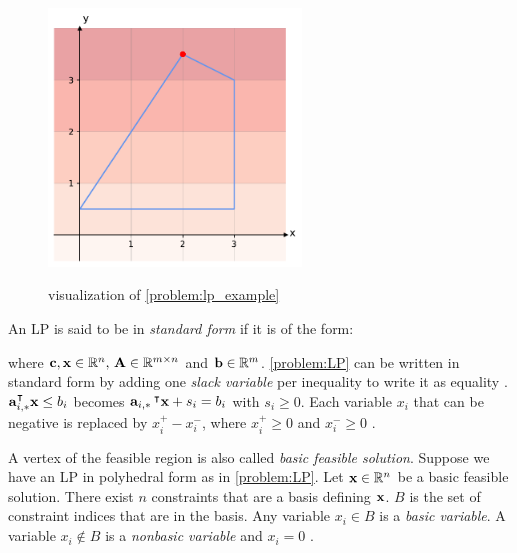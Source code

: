 \begin{figure}[h!]
    \caption{visualization of \cref{problem:lp_example}}
    \centering
    \includegraphics[width=0.6\textwidth]{Images/lp.pdf}
    \label{fig:lp}
\end{figure} 

An LP is said to be in \textit{standard form} if it is of the form:

\quad where $\bold c, \bold x \in \mathbb{R}^n, \, \bold A \in \mathbb{R}^{m \times n}$ and $\bold b \in \mathbb{R}^m$. 
\cref{problem:LP} can be written in standard form by adding one \textit{slack variable} per inequality to write it as equality \cite{noauthor_numerical_2006}. $\bold a_{i,*}^\intercal \bold x \leq b_i$ becomes $\bold a_{i,*} \,^\intercal \bold x + s_i = b_i$ with $s_i \geq 0$. Each variable $x_i$ that can be negative is replaced by $x_i^+ - x_i^-$, where $x_i^+ \geq 0$ and $x_i^- \geq 0$ \cite{noauthor_numerical_2006}.

A vertex of the feasible region is also called \textit{basic feasible solution}. Suppose we have an LP in polyhedral form as in \cref{problem:LP}. Let $\bold x \in \mathbb{R}^n$ be a basic feasible solution. There exist $n$ constraints that are a basis defining $\bold x$.  $B$ is the set of constraint indices that are in the basis. Any variable $x_i \in B$ is a \textit{basic variable}. A variable $x_i \not \in B$ is a \textit{nonbasic variable} and $x_i=0$ \cite{understanding_lp}.

